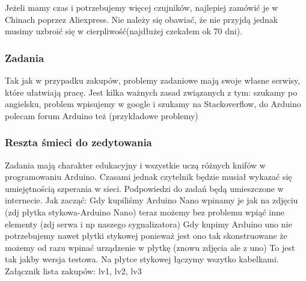 Jeżeli mamy czas i potrzebujemy więcej czujników, najlepiej zamówić je w Chinach poprzez Aliexpress. Nie należy się obawiać, że nie przyjdą jednak musimy uzbroić się w cierpliwość(najdłużej czekałem ok 70 dni).

\subsubsection{Zadania}
Tak jak w przypadku zakupów, problemy zadaniowe mają swoje własne serwisy, które ułatwiają pracę. Jest kilka ważnych zasad związanych z tym: szukamy po angielsku, problem wpisujemy w google i szukamy na Stackoverflow, do Arduino polecam forum Arduino też (przykładowe problemy)
\subsubsection{Reszta śmieci do zedytowania}
Zadania mają charakter edukacyjny i wszystkie uczą różnych knifów w programowaniu Arduino. Czasami jednak czytelnik będzie musiał wykazać się umiejętnością szperania w sieci. Podpowiedzi do zadań będą umieszczone w internecie.
Jak zacząć:
Gdy kupiliśmy Arduino Nano wpinamy je jak na zdjęciu (zdj płytka stykowa-Arduino Nano) teraz możemy bez problemu wpiąć inne elementy (zdj serwa i np naszego sygnalizatora)
Gdy kupimy Arduino uno nie potrzebujemy nawet płytki stykowej ponieważ jest ono tak skonstruowane że możemy od razu wpinać urządzenie w płytkę
(znowu zdjęcia ale z uno)
To jest tak jakby wersja testowa. Na płytce stykowej łączymy wszytko kabelkami.
Załącznik lista zakupów: lv1, lv2, lv3

